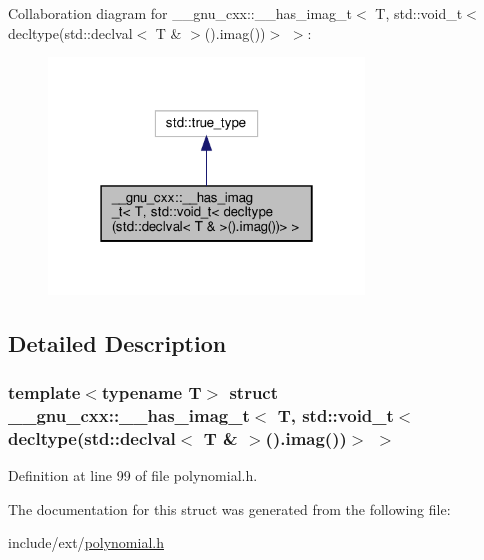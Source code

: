 Collaboration diagram for \+\_\+\+\_\+gnu\+\_\+cxx\+:\+:\+\_\+\+\_\+has\+\_\+imag\+\_\+t$<$ T, std\+:\+:void\+\_\+t$<$ decltype(std\+:\+:declval$<$ T \& $>$().imag())$>$ $>$\+:
\nopagebreak
\begin{figure}[H]
\begin{center}
\leavevmode
\includegraphics[width=238pt]{struct____gnu__cxx_1_1____has__imag__t_3_01T_00_01std_1_1void__t_3_01decltype_07std_1_1declval_3cb6c63a7804d363515b69cb8f2b24389}
\end{center}
\end{figure}


\subsection{Detailed Description}
\subsubsection*{template$<$typename T$>$\newline
struct \+\_\+\+\_\+gnu\+\_\+cxx\+::\+\_\+\+\_\+has\+\_\+imag\+\_\+t$<$ T, std\+::void\+\_\+t$<$ decltype(std\+::declval$<$ T \& $>$().\+imag())$>$ $>$}



Definition at line 99 of file polynomial.\+h.



The documentation for this struct was generated from the following file\+:\begin{DoxyCompactItemize}
\item 
include/ext/\hyperlink{polynomial_8h}{polynomial.\+h}\end{DoxyCompactItemize}
